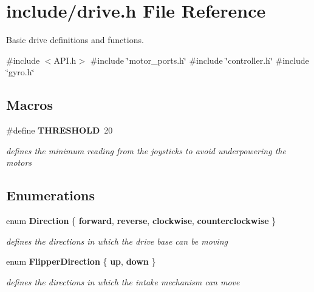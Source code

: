 \section{include/drive.h File Reference}
\label{drive_8h}


Basic drive definitions and functions.  


{\ttfamily \#include $<$A\+P\+I.\+h$>$}\newline
{\ttfamily \#include \char`\"{}motor\+\_\+ports.\+h\char`\"{}}\newline
{\ttfamily \#include \char`\"{}controller.\+h\char`\"{}}\newline
{\ttfamily \#include \char`\"{}gyro.\+h\char`\"{}}\newline
\subsection*{Macros}
\begin{DoxyCompactItemize}
\item 
\#define \textbf{ T\+H\+R\+E\+S\+H\+O\+LD}~20
\begin{DoxyCompactList}\small\item\em defines the minimum reading from the joysticks to avoid underpowering the motors \end{DoxyCompactList}\end{DoxyCompactItemize}
\subsection*{Enumerations}
\begin{DoxyCompactItemize}
\item 
enum \textbf{ Direction} \{ \textbf{ forward}, 
\textbf{ reverse}, 
\textbf{ clockwise}, 
\textbf{ counterclockwise}
 \}
\begin{DoxyCompactList}\small\item\em defines the directions in which the drive base can be moving \end{DoxyCompactList}\item 
enum \textbf{ Flipper\+Direction} \{ \textbf{ up}, 
\textbf{ down}
 \}
\begin{DoxyCompactList}\small\item\em defines the directions in which the intake mechanism can move \end{DoxyCompactList}\end{DoxyCompactItemize}
